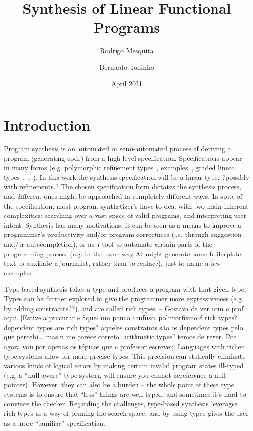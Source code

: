 \documentclass{llncs}
\title{Synthesis of Linear Functional Programs}
\author{Rodrigo Mesquita \and Bernardo Toninho}
\date{April 2021}
\institute{NOVA School of Science and Technology}
\begin{document}
\maketitle

\section{Introduction}

Program synthesis is an automated or semi-automated process of
 deriving a program (generating code) from a high-level specification.
 Specifications appear in many forms (e.g.
 polymorphic refinement types~\cite{DBLP:conf/pldi/PolikarpovaKS16},
 examples~\cite{DBLP:conf/popl/FrankleOWZ16},
 graded linear types~\cite{DBLP:conf/lopstr/HughesO20}, ...).
 In this work the synthesis specification will be a linear type, ?possibly with refinements.?
 The chosen specification form dictates the synthesis process, and different ones might
 be approached in completely different ways.
 In spite of the specification, most program synthetizer's have to deal with two main
 inherent complexities: searching over a vast space of valid programs, and interpreting user intent.
 Synthesis has many motivations, it can be seen as a means to improve a programmer's productivity and/or
 program correctness (i.e. through suggestion and/or autocompletion), or as a tool to automate certain parts
 of the programming process (e.g. in the same way AI might generate some boilerplate text to auxiliate a journalist, rather
 than to replace), just to name a few examples.

Type-based synthesis takes a type and produces a program with that given type. 
Types can be further explored to give the programmer more expressiveness (e.g. by adding constraints??), and are called rich types.
-- Gostava de ver com o prof aqui. [Estive a procurar e fiquei um pouco confuso. polimorfismo é rich types?
dependent types are rich types? aqueles constraints são os dependent types pelo que percebi... mas n me
parece correto. arithmetic types? temos de rever. Por agora vou por apenas os tópicos que o professor escreveu]
Languages with richer type systems allow for more precise
  types. This precision can statically eliminate various kinds of
  logical errors by making certain invalid program states ill-typed
  (e.g. a ``null aware'' type system, will ensure you cannot
  dereference a null-pointer).
However, they can also be a burden -- the whole point of these type
  systems is to ensure that ``less'' things are well-typed, and
  sometimes it's hard to convince the checker.
Regarding the challenges, type-based synthesis leverages rich types as a way of pruning
  the search space, and by using types gives the user as a more ``familiar'' specification.
\end{document}
